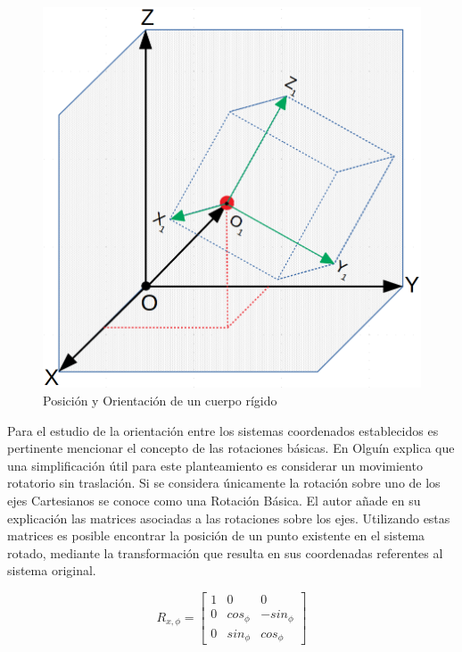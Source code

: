 \begin{figure}[ht]
\centering
\includegraphics[scale= 0.2]{Figures/RigidBodyPos.png}
    \caption{Posición y Orientación de un cuerpo rígido}
    \label{fig:RigidBodyPos}
\end{figure}

Para el estudio de la orientación entre los sistemas coordenados establecidos es pertinente mencionar el concepto de las rotaciones básicas. En \cite{olguin_diaz_3d_2019} Olguín explica que una simplificación útil para este planteamiento es considerar un movimiento rotatorio sin traslación. Si se considera únicamente la rotación sobre uno de los ejes Cartesianos se conoce como una Rotación Básica. El autor añade en su explicación las matrices asociadas a las rotaciones sobre los ejes. Utilizando estas matrices es posible encontrar la posición de un punto existente en el sistema rotado, mediante la transformación que resulta en sus coordenadas referentes al sistema original.

\begin{equation*}
    R_{x,\phi}=\begin{bmatrix}
    1 & 0 & 0\\
    0 & cos_{\phi} & -sin_{\phi}\\
    0 & sin_{\phi} & cos_{\phi}
    \end{bmatrix}
\end{equation*}

